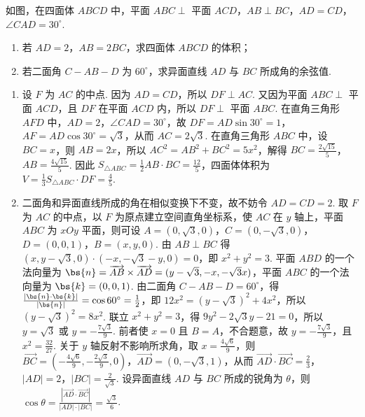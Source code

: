 \begin{problem}
如图，在四面体 \(ABCD\) 中，平面 \(ABC \perp\) 平面 \(ACD\)，\(AB \perp BC\)，\(AD = CD\)，\(\angle CAD = 30^\circ\).
\begin{enumerate}
\item 若 \(AD = 2\)，\(AB = 2BC\)，求四面体 \(ABCD\) 的体积；
\item 若二面角 \(C - AB - D\) 为 \(60^{\circ}\)，求异面直线 \(AD\) 与 \(BC\) 所成角的余弦值.
\end{enumerate}

\end{problem}

\begin{solution}
\begin{enumerate}
\item 设 \(F\) 为 \(AC\) 的中点. 因为 \(AD=CD\)，所以 \(DF\perp AC\). 又因为平面 \(ABC\perp\) 平面 \(ACD\)，且 \(DF\) 在平面 \(ACD\) 内，所以 \(DF\perp\) 平面 \(ABC\). 在直角三角形 \(AFD\) 中，\(AD=2\)，\(\angle CAD=30^\circ\)，故 \(DF=AD\sin30^\circ=1\)，\(AF=AD\cos30^\circ=\sqrt{3}\)，从而 \(AC=2\sqrt{3}\). 在直角三角形 \(ABC\) 中，设 \(BC=x\)，则 \(AB=2x\)，所以 \(AC^2=AB^2+BC^2=5x^2\)，解得 \(BC=\frac{2\sqrt{15}}{5}\)，\(AB=\frac{4\sqrt{15}}{5}\). 因此 \(S_{\triangle ABC}=\frac{1}{2}AB\cdot BC=\frac{12}{5}\)，四面体体积为 \(V=\frac{1}{3}S_{\triangle ABC}\cdot DF=\frac{4}{5}\).
\item 二面角和异面直线所成的角在相似变换下不变，故不妨令 \(AD=CD=2\). 取 \(F\) 为 \(AC\) 的中点，以 \(F\) 为原点建立空间直角坐标系，使 \(AC\) 在 \(y\) 轴上，平面 \(ABC\) 为 \(xOy\) 平面，则可设 \(A=(0,\sqrt{3},0)\)，\(C=(0,-\sqrt{3},0)\)，\(D=(0,0,1)\)，\(B=(x,y,0)\). 由 \(AB\perp BC\) 得 \((x,y-\sqrt{3},0)\cdot(-x,-\sqrt{3}-y,0)=0\)，即 \(x^2+y^2=3\). 平面 \(ABD\) 的一个法向量为 \(\bs{n}=\overrightarrow{AB}\times\overrightarrow{AD}=(y-\sqrt{3},-x,-\sqrt{3}x)\)，平面 \(ABC\) 的一个法向量为 \(\bs{k}=(0,0,1)\). 由二面角 \(C-AB-D=60^\circ\)，得 \(\frac{|\bs{n}\cdot\bs{k}|}{|\bs{n}|}=\cos60^\circ=\frac{1}{2}\)，即 \(12x^2=(y-\sqrt{3})^2+4x^2\)，所以 \((y-\sqrt{3})^2=8x^2\). 联立 \(x^2+y^2=3\)，得 \(9y^2-2\sqrt{3}y-21=0\)，所以 \(y=\sqrt{3}\) 或 \(y=-\frac{7\sqrt{3}}{9}\). 前者使 \(x=0\) 且 \(B=A\)，不合题意，故 \(y=-\frac{7\sqrt{3}}{9}\)，且 \(x^2=\frac{32}{27}\). 关于 \(y\) 轴反射不影响所求角，取 \(x=\frac{4\sqrt{6}}{9}\)，则 \(\overrightarrow{BC}=\left(-\frac{4\sqrt{6}}{9},-\frac{2\sqrt{3}}{9},0\right)\)，\(\overrightarrow{AD}=(0,-\sqrt{3},1)\)，从而 \(\overrightarrow{AD}\cdot\overrightarrow{BC}=\frac{2}{3}\)，\(|AD|=2\)，\(|BC|=\frac{2}{\sqrt{3}}\). 设异面直线 \(AD\) 与 \(BC\) 所成的锐角为 \(\theta\)，则 \(\cos\theta=\frac{|\overrightarrow{AD}\cdot\overrightarrow{BC}|}{|AD|\cdot|BC|}=\frac{\sqrt{3}}{6}\).
\end{enumerate}
\end{solution}

